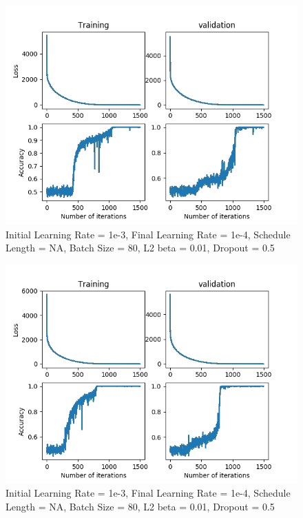 \documentclass[12pt,reqno]{amsart}
\numberwithin{equation}{section}
\begin{document}
\begin{enumerate}
\begin{figure}[H]
\centering
\includegraphics[scale=0.6]{threshold-test-1e-3-1e-4-2}
\caption{Initial Learning Rate = 1e-3, Final Learning Rate = 1e-4, Schedule Length = NA, Batch Size = 80, L2 beta = 0.01, Dropout = 0.5}
\end{figure}

\begin{figure}[H]
\centering
\includegraphics[scale=0.6]{threshold-test-1e-3-1e-4-3}
\caption{Initial Learning Rate = 1e-3, Final Learning Rate = 1e-4, Schedule Length = NA, Batch Size = 80, L2 beta = 0.01, Dropout = 0.5}
\end{figure}


\end{enumerate}
\end{document}

